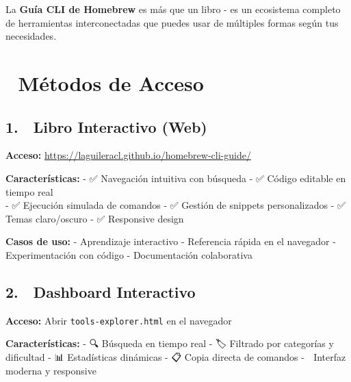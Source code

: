 \documentclass[
  11pt,
  letterpaper,
  oneside,
  openany]{scrbook}
\begin{document}
\begin{tcolorbox}[enhanced jigsaw, coltitle=black, breakable, arc=.35mm, toprule=.15mm, colbacktitle=quarto-callout-tip-color!10!white, colframe=quarto-callout-tip-color-frame, opacityback=0, colback=white, bottomtitle=1mm, bottomrule=.15mm, rightrule=.15mm, left=2mm, toptitle=1mm, leftrule=.75mm, title=\textcolor{quarto-callout-tip-color}{\faLightbulb}\hspace{0.5em}{Un Ecosistema Completo y Conectado}, titlerule=0mm, opacitybacktitle=0.6]

La \textbf{Guía CLI de Homebrew} es más que un libro - es un ecosistema
completo de herramientas interconectadas que puedes usar de múltiples
formas según tus necesidades.

\end{tcolorbox}

\section{🎯 Métodos de Acceso}\label{muxe9todos-de-acceso}

\subsection{1. 📖 Libro Interactivo (Web)}\label{libro-interactivo-web}

\textbf{Acceso:} \url{https://laguileracl.github.io/homebrew-cli-guide/}

\textbf{Características:} - ✅ Navegación intuitiva con búsqueda - ✅
Código editable en tiempo real\\
- ✅ Ejecución simulada de comandos - ✅ Gestión de snippets
personalizados - ✅ Temas claro/oscuro - ✅ Responsive design

\textbf{Casos de uso:} - Aprendizaje interactivo - Referencia rápida en
el navegador - Experimentación con código - Documentación colaborativa

\subsection{2. 📱 Dashboard Interactivo}\label{dashboard-interactivo}

\textbf{Acceso:} Abrir \texttt{tools-explorer.html} en el navegador

\textbf{Características:} - 🔍 Búsqueda en tiempo real - 🏷️ Filtrado por
categorías y dificultad - 📊 Estadísticas dinámicas - 📋 Copia directa
de comandos - 🎨 Interfaz moderna y responsive
\end{document}
